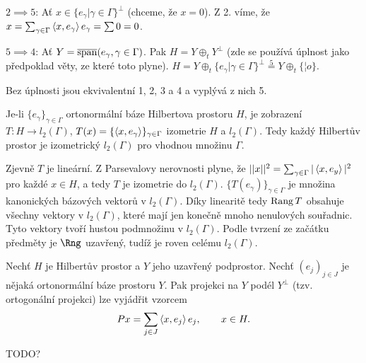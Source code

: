 \documentclass[12pt]{article}					%
\begin{document}
\begin{veta}
\begin{dukazin}
		$2 \implies 5$: Ať $x \in \{e_\gamma | \gamma \in \Gamma\}^{\perp}$ (chceme, že $x = 0$). Z 2. víme, že $x = \sum_{\gamma \in \Gamma}\left\langle x, e_\gamma\right\rangle e_\gamma = \sum 0 = 0$.

		$5 \implies 4$: Ať $Y = \overline{\operatorname{span}}(e_\gamma, \gamma \in \Gamma)$. Pak $H = Y \oplus_t Y^{\perp}$ (zde se používá úplnost jako předpoklad věty, ze které toto plyne). $H = Y \oplus_t \{e_\gamma | \gamma \in \Gamma\}^\perp \overset{5}{=} Y \oplus_t \{¦o\}$.
	\end{dukazin}

	\begin{poznamka}
		Bez úplnosti jsou ekvivalentní 1, 2, 3 a 4 a vyplývá z nich 5.
	\end{poznamka}
\end{veta}


\begin{veta}
	Je-li $\{e_\gamma\}_{\gamma \in \Gamma}$ ortonormální báze Hilbertova prostoru $H$, je zobrazení $T: H \rightarrow l_2(\Gamma)$, $T(x) = \{\left\langle x, e_\gamma\right\rangle\}_{\gamma \in \Gamma}$ izometrie $H$ a $l_2(\Gamma)$. Tedy každý Hilbertův prostor je izometrický $l_2(\Gamma)$ pro vhodnou množinu $\Gamma$.

	\begin{dukazin}[Ze skript]
		Zjevně $T$ je lineární. Z Parsevalovy nerovnosti plyne, že $||x||^2 = \sum_{\gamma \in \Gamma} |\left\langle x, e_y\right\rangle|^2$ pro každé $x \in H$, a tedy $T$ je izometrie do $l_2(\Gamma)$. $\{T(e_\gamma)\}_{\gamma \in \Gamma}$ je množina kanonických bázových vektorů v $l_2(\Gamma)$. Díky linearitě tedy $\operatorname{Rang} T$ obsahuje všechny vektory v $l_2(\Gamma)$, které mají jen konečně mnoho nenulových souřadnic. Tyto vektory tvoří hustou podmnožinu v $l_2(\Gamma)$. Podle tvrzení ze začátku předměty je $\Rng$ uzavřený, tudíž je roven celému $l_2(\Gamma)$.
	\end{dukazin}
\end{veta}

\begin{veta}
	Nechť $H$ je Hilbertův prostor a $Y$ jeho uzavřený podprostor. Nechť $(e_j)_{j \in J}$ je nějaká ortonormální báze prostoru $Y$. Pak projekci na $Y$ podél $Y^\perp$ (tzv. ortogonální projekci) lze vyjádřit vzorcem
	$$ Px = \sum_{j \in J}\left\langle x, e_j\right\rangle e_j, \qquad x \in H. $$

	\begin{dukazin}
		TODO?
	\end{dukazin}
\end{veta}
\end{document}
